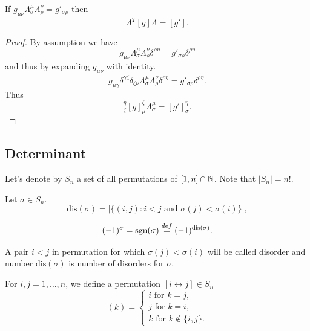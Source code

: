 \documentclass[main.tex]{subfiles}
\begin{document}
\begin{theorem}
\label{skewed-lorentz}
If $g_{\mu\nu} \Lambda^\mu_\sigma \Lambda^\nu_\rho = g'_{\sigma\rho}$ then
\begin{equation}
\Lambda^T [g] \Lambda = [g'].
\end{equation}
\end{theorem}
\begin{proof}
By assumption we have
\begin{equation}
g_{\mu\nu} \Lambda^\mu_\sigma \Lambda^\nu_\rho \delta^{\rho \eta} = g'_{\sigma\rho} \delta^{\rho \eta} 
\end{equation}
and thus by expanding $g_{\mu\nu}$ with identity.
\begin{equation}
g_{\mu\gamma}\delta^{\gamma\zeta}\delta_{\zeta \nu} \Lambda^\mu_\sigma \Lambda^\nu_\rho \delta^{\rho \eta} = g'_{\sigma\rho} \delta^{\rho \eta}.
\end{equation}
Thus
\begin{equation}
[\Lambda^T]^\eta_\zeta [g]_\mu^\zeta \Lambda^\mu_\sigma  = [g']_\sigma^\eta.
\end{equation}
\end{proof}

\subsection{Determinant}

Let's denote by $S_n$ a set of all permutations of $[1, n]\cap\mathbb{N}$. Note that $|S_n| = n!$.
\begin{definition}
\label{permutation-sign}
Let $\sigma\in S_n$.
\begin{equation}
\text{dis}(\sigma) = {|\{(i,j): i < j \text{ and }\sigma(j) < \sigma(i)\}|},
\end{equation}

\begin{equation}
(-1)^\sigma = \text{sgn}(\sigma) \stackrel{def}{=} (-1)^{\text{dis}(\sigma)}.
\end{equation}

\end{definition}

A pair $i < j$ in permutation for which $\sigma(j) < \sigma(i)$ will be called disorder and number $\text{dis}(\sigma)$ is number of disorders for $\sigma$. 
\begin{definition}
For $i, j = 1, \dots, n$, we define a permutation $[i\leftrightarrow j]\in S_n$
\begin{equation}
[i\leftrightarrow j](k) = 
\begin{cases}
i \text{ for } k = j,\\
j \text{ for } k = i,\\
k \text{ for } k\not\in\{i,j\}.
\end{cases} 
\end{equation}
\end{definition}  
\end{document}

